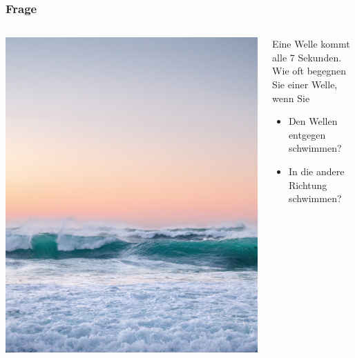 \documentclass{beamer}
\begin{document}

\begin{frame}
\frametitle{Frage}

\begin{columns}[c]

\begin{column}{5cm}
\begin{center}
\includegraphics[width=\textwidth]{wellen_meer.jpg}
\end{center}

\end{column}


\begin{column}{5cm}

Eine Welle kommt alle 7 Sekunden. \\[0.5 cm]

Wie oft begegnen Sie einer Welle, wenn Sie


\begin{itemize}
\item
Den Wellen entgegen schwimmen?
\item
In die andere Richtung schwimmen?
\end{itemize}


\end{column}


\end{columns}

\end{frame}
\end{document}
